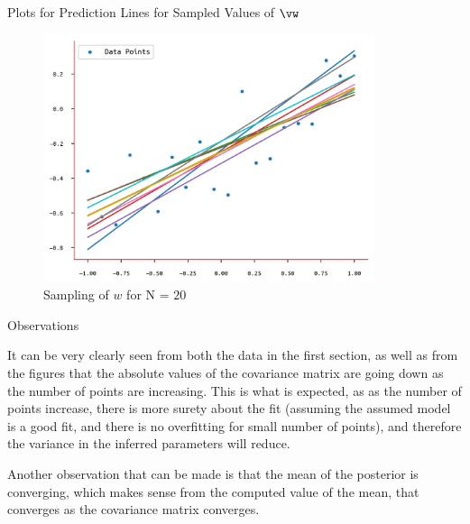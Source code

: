 \documentclass{article}
\begin{document}
\begin{question}
\begin{qsection}{Plots for Prediction Lines for Sampled Values of $\vw$}
		\begin{figure}[h!]
			\centering
			\includegraphics[height=275px]{includes/plots/q4c/predictive-models-5.png}
			\caption{Sampling of $w$ for N = $20$}
		\end{figure}

	\end{qsection}

	\clearpage

	\begin{qsection}{Observations}

		It can be very clearly seen from both the data in the first section, as well as from the figures that the absolute values of the covariance matrix are going down as the number of points are increasing.
		This is what is expected, as as the number of points increase, there is more surety about the fit (assuming the assumed model is a good fit, and there is no overfitting for small number of points), and therefore the variance in the inferred parameters will reduce.

		Another observation that can be made is that the mean of the posterior is converging, which makes sense from the computed value of the mean, that converges as the covariance matrix converges.

	\end{qsection}

\end{question}
\end{document}
